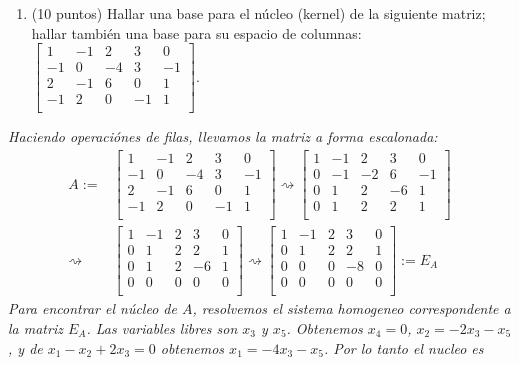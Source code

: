 \documentclass[12pt,a4paper]{amsart}
\begin{document}
\begin{enumerate}
\item (10 puntos) Hallar una base para el n\'ucleo (kernel) de la siguiente matriz; hallar tambi\'en una base para su
espacio de columnas:
$\left[
\begin{array}{ccccc}
 1 & -1 & 2 & 3 & 0 \\
 -1 & 0 & -4 & 3 & -1 \\
 2 & -1 & 6 & 0 & 1 \\
-1 & 2 & 0 & -1 & 1 \\
\end{array}
\right].$

\end{enumerate}

 \vskip 0.5cm
\emph{Haciendo operaci\'ones de filas, llevamos la matriz a forma escalonada:
\begin{align*}
A:=&\left[
\begin{array}{ccccc}
 1 & -1 & 2 & 3 & 0 \\
 -1 & 0 & -4 & 3 & -1 \\
 2 & -1 & 6 & 0 & 1 \\
-1 & 2 & 0 & -1 & 1 \\
\end{array}
\right]\rightsquigarrow
\left[
\begin{array}{ccccc}
 1 & -1 & 2 & 3 & 0 \\
 0 & -1 & -2 & 6 & -1 \\
0 & 1 & 2 & -6 & 1 \\
0 & 1 & 2 & 2 & 1 \\
\end{array}
\right]
\\ \rightsquigarrow&
\left[
\begin{array}{ccccc}
 1 & -1 & 2 & 3 & 0 \\
 0 & 1 & 2 & 2 & 1 \\
0 & 1 & 2 & -6 & 1 \\
0 & 0 & 0 & 0 & 0 \\
\end{array}
\right]\rightsquigarrow
\left[
\begin{array}{ccccc}
 1 & -1 & 2 & 3 & 0 \\
 0 & 1 & 2 & 2 & 1 \\
0 & 0 & 0 & -8 & 0 \\
0 & 0 & 0 & 0 & 0 \\
\end{array}
\right]:=E_A
\end{align*}
Para encontrar el n\'ucleo de $A$, resolvemos el sistema homogeneo correspondente a la matriz $E_A$. Las variables libres son $x_3$ y $x_5$. Obtenemos $x_4=0$, $x_2=-2x_3-x_5$, y de $x_1-x_2+2x_3=0$ obtenemos $x_1=-4x_3-x_5$. Por lo tanto el nucleo es
}
\end{document}
